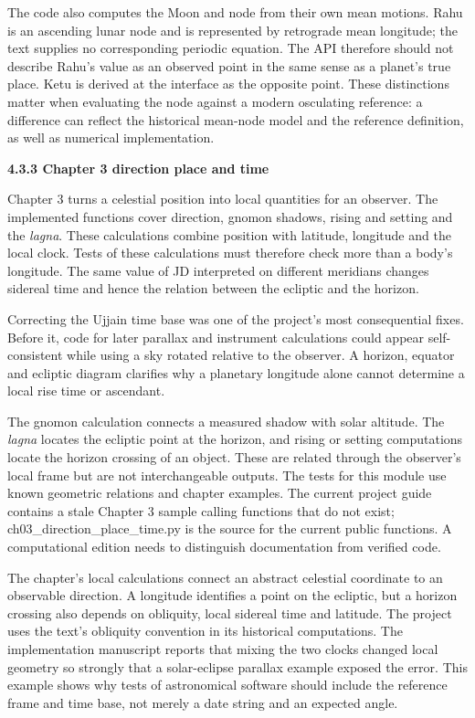 \documentclass[
]{article}
\begin{document}
The code also computes the Moon and node from their own mean motions.
Rahu is an ascending lunar node and is represented by retrograde mean
longitude; the text supplies no corresponding periodic equation. The API
therefore should not describe Rahu's value as an observed point in the
same sense as a planet's true place. Ketu is derived at the interface as
the opposite point. These distinctions matter when evaluating the node
against a modern osculating reference: a difference can reflect the
historical mean-node model and the reference definition, as well as
numerical implementation.

\textbf{4.3.3 Chapter 3 direction place and time}

Chapter 3 turns a celestial position into local quantities for an
observer. The implemented functions cover direction, gnomon shadows,
rising and setting and the \emph{lagna}. These calculations combine
position with latitude, longitude and the local clock. Tests of these
calculations must therefore check more than a body's longitude. The same
value of JD interpreted on different meridians changes sidereal time and
hence the relation between the ecliptic and the horizon.

Correcting the Ujjain time base was one of the project's most
consequential fixes. Before it, code for later parallax and instrument
calculations could appear self-consistent while using a sky rotated
relative to the observer. A horizon, equator and ecliptic diagram
clarifies why a planetary longitude alone cannot determine a local rise
time or ascendant.

The gnomon calculation connects a measured shadow with solar altitude.
The \emph{lagna} locates the ecliptic point at the horizon, and rising
or setting computations locate the horizon crossing of an object. These
are related through the observer's local frame but are not
interchangeable outputs. The tests for this module use known geometric
relations and chapter examples. The current project guide contains a
stale Chapter 3 sample calling functions that do not exist;
ch03\_direction\_place\_time.py is the source for the current public
functions. A computational edition needs to distinguish documentation
from verified code.

The chapter's local calculations connect an abstract celestial
coordinate to an observable direction. A longitude identifies a point on
the ecliptic, but a horizon crossing also depends on obliquity, local
sidereal time and latitude. The project uses the text's obliquity
convention in its historical computations. The implementation manuscript
reports that mixing the two clocks changed local geometry so strongly
that a solar-eclipse parallax example exposed the error. This example
shows why tests of astronomical software should include the reference
frame and time base, not merely a date string and an expected angle.
\end{document}
